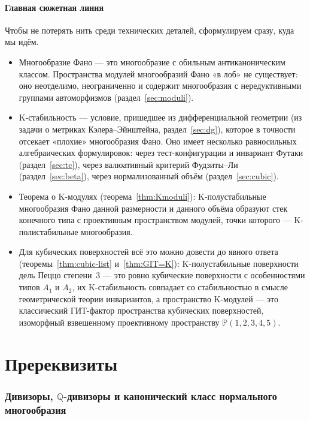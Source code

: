 \documentclass[11pt,a4paper]{article}
\theoremstyle{plain}
\theoremstyle{definition}
\theoremstyle{remark}
\newcommand{\Q}{\mathbb{Q}}
\newcommand{\PP}{\mathbb{P}}
\begin{document}
\subsection*{Главная сюжетная линия}

Чтобы не потерять нить среди технических деталей, сформулируем сразу, куда мы идём.

\begin{itemize}
\item Многообразие Фано --- это многообразие с обильным антиканоническим классом. Пространства
модулей многообразий Фано «в лоб» не существует: оно неотделимо, неограниченно и содержит
многообразия с нередуктивными группами автоморфизмов (раздел~\ref{sec:moduli}).
\item K-стабильность --- условие, пришедшее из дифференциальной геометрии (из задачи о метриках
Кэлера--Эйнштейна, раздел~\ref{sec:dg}), которое в точности отсекает «плохие» многообразия Фано.
Оно имеет несколько равносильных алгебраических формулировок: через тест-конфигурации и
инвариант Футаки (раздел~\ref{sec:tc}), через валюативный критерий Фудзиты--Ли
(раздел~\ref{sec:beta}), через нормализованный объём (раздел~\ref{sec:cubic}).
\item Теорема о K-модулях (теорема~\ref{thm:Kmoduli}): K-полустабильные многообразия Фано данной
размерности и данного объёма образуют стек конечного типа с проективным пространством модулей,
точки которого --- K-полистабильные многообразия.
\item Для кубических поверхностей всё это можно довести до явного ответа (теоремы~\ref{thm:cubic-list}
и~\ref{thm:GIT=K}): K-полустабильные поверхности дель Пеццо степени~3 --- это ровно кубические
поверхности с особенностями типов $A_1$ и $A_2$, их K-стабильность совпадает со стабильностью в
смысле геометрической теории инвариантов, а пространство K-модулей --- это классический
ГИТ-фактор пространства кубических поверхностей, изоморфный взвешенному проективному пространству
$\PP(1,2,3,4,5)$.
\end{itemize}

\part{Пререквизиты}

\section{Дивизоры, $\Q$-дивизоры и канонический класс нормального многообразия}\label{sec:div}
\end{document}

